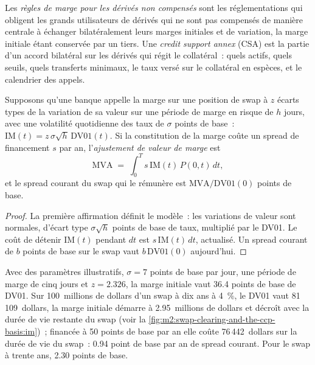 \begin{definition}\label{def:m2:swap-clearing-and-the-ccp-basis:umr}
Les \emph{règles de marge pour les dérivés non compensés} sont les
réglementations qui obligent les grands utilisateurs de dérivés qui ne sont pas
compensés de manière centrale à échanger bilatéralement leurs marges initiales et de variation, la marge initiale
étant conservée par un tiers. Une \emph{credit support annex}
(CSA) est la partie d'un accord bilatéral sur les dérivés qui régit le
collatéral~: quels actifs, quels seuils, quels transferts minimaux, le taux versé
sur le collatéral en espèces, et le calendrier des appels.
\end{definition}

\begin{proposition}\label{prop:m2:swap-clearing-and-the-ccp-basis:mva}
Supposons qu'une banque appelle la marge sur une position de swap à $z$ écarts types de la
variation de sa valeur sur une période de marge en risque de $h$ jours, avec une volatilité quotidienne des taux de
$\sigma$ points de base~: $\mathrm{IM}(t) = z\,\sigma\sqrt{h}\,\mathrm{DV01}(t)$. Si
la constitution de la marge coûte un spread de financement $s$ par an, l'\emph{ajustement de
valeur de marge} est
\[
\mathrm{MVA} \;=\; \int_0^T s\,\mathrm{IM}(t)\,P(0,t)\,dt,
\]
et le spread courant du swap qui le rémunère est
$\mathrm{MVA}/\mathrm{DV01}(0)$ points de base.
\end{proposition}
\begin{proof}
La première affirmation définit le modèle~: les variations de valeur sont normales, d'écart type
$\sigma\sqrt h$ points de base de taux, multiplié par le DV01. Le coût
de détenir $\mathrm{IM}(t)$ pendant $dt$ est $s\,\mathrm{IM}(t)\,dt$, actualisé. Un
spread courant de $b$ points de base sur le swap vaut $b\,\mathrm{DV01}(0)$
aujourd'hui.
\end{proof}

\begin{example}\label{ex:m2:swap-clearing-and-the-ccp-basis:mva}
Avec des paramètres illustratifs, $\sigma = 7$ points de base par jour, une période de marge de cinq jours
et $z = 2.326$, la marge initiale vaut 36.4 points de base de DV01. Sur 100~millions
de dollars d'un swap à dix ans à 4~\%, le DV01 vaut 81\,109~dollars, la marge initiale démarre à
2.95~millions de dollars et décroît avec la durée de vie restante du swap
(voir la \cref{fig:m2:swap-clearing-and-the-ccp-basis:im})~; financée à 50 points de base par an
elle coûte 76\,442~dollars sur la durée de vie du swap~: 0.94 point de base par an de
spread courant. Pour le swap à trente ans, 2.30 points de base.
\end{example}

